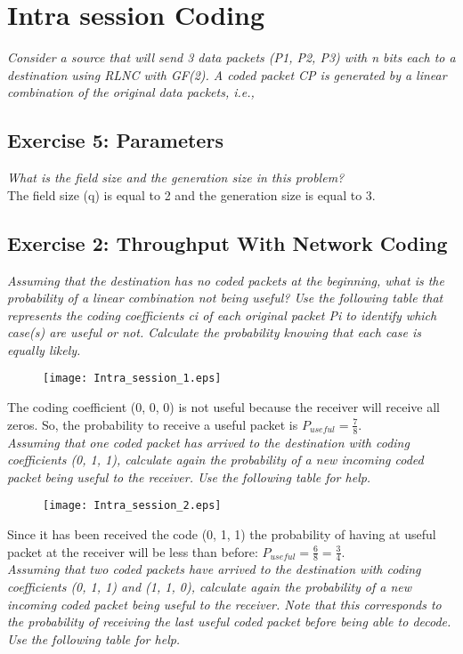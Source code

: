 \section{Intra session Coding}
\textit{Consider a source that will send 3 data packets (P1, P2, P3) with n bits each to a destination using RLNC with GF(2). A coded packet CP is generated by a linear combination of the original data packets, i.e.,}

\subsection{Exercise 5: Parameters }
\textit{What is the field size and the generation size in this problem?}\\
The field size (q) is equal to 2 and the generation size is equal to 3. 

\subsection{Exercise 2: Throughput With Network Coding}
\textit{Assuming that the destination has no coded packets at the beginning, what is the probability of a linear combination not being useful? Use the following table that represents the coding coefficients ci of each original packet Pi to identify which case(s) are useful or not. Calculate the probability knowing that each case is equally likely.}\\

\begin{figure}[!h]
  \centering
  \texttt{[image: Intra\_session\_1.eps]}
  \caption{}
  \label{fig:Intra_session_1}
\end{figure}
The coding coefficient (0, 0, 0) is not useful because the receiver will receive all zeros. So, the probability to receive a useful packet is $P_{useful}=\frac{7}{8}$.\\

\textit{Assuming that one coded packet has arrived to the destination with coding coefficients (0, 1, 1), calculate again the probability of a new incoming coded packet being useful to the receiver. Use the following table for help.}\\

\begin{figure}[!h]
  \centering
  \texttt{[image: Intra\_session\_2.eps]}
  \caption{}
  \label{fig:Intra_session_2}
\end{figure}

Since it has been received the code (0, 1, 1) the probability of having at useful packet at the receiver will be less than before: $P_{useful}=\frac{6}{8}=\frac{3}{4}$.\\
\textit{Assuming that two coded packets have arrived to the destination with coding coefficients (0, 1, 1) and (1, 1, 0), calculate again the probability of a new incoming coded packet being useful to the receiver. Note that this corresponds to the probability of receiving the last useful coded packet before being able to decode. Use the following table for help.}\\

